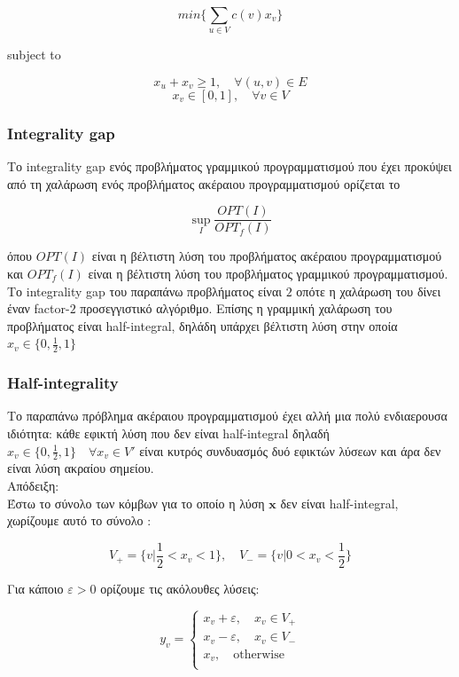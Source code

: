 $$min\{\displaystyle\sum_{u\in{V}} c(v)x_v\}$$ 
\centerline{subject to}
$$x_u + x_v \geq{1}, \quad \forall (u, v) \in{E}$$
$$ x_v \in [0,1], \quad \forall v \in{V}$$

\subsubsection{Integrality gap}
Το integrality gap ενός προβλήματος γραμμικού προγραμματισμού που έχει προκύψει από τη χαλάρωση ενός προβλήματος ακέραιου προγραμματισμού ορίζεται το 

$$\sup_{I} \frac{OPT(I)}{OPT_f(I)}$$

όπου $OPT(I)$ είναι η βέλτιστη λύση του προβλήματος ακέραιου προγραμματισμού και $OPT_f(I)$ είναι η βέλτιστη λύση του προβλήματος γραμμικού προγραμματισμού.\\

Το integrality gap του παραπάνω προβλήματος είναι $2$ οπότε η χαλάρωση του δίνει έναν factor-$2$ προσεγγιστικό αλγόριθμο. Επίσης η γραμμική χαλάρωση του προβλήματος είναι half-integral, δηλάδη υπάρχει βέλτιστη λύση στην οποία $x_v \in{\{0, \frac{1}{2}, 1\}}$	

\subsubsection{Half-integrality}

Το παραπάνω πρόβλημα ακέραιου προγραμματισμού έχει αλλή μια πολύ ενδιαερουσα ιδιότητα: κάθε εφικτή λύση που δεν είναι half-integral δηλαδή $x_v \in{\{0, \frac{1}{2}, 1\}} \quad \forall x_v \in V'$ είναι κυτρός συνδυασμός δυό εφικτών λύσεων και άρα δεν είναι λύση ακραίου σημείου.\\

Απόδειξη:\\
Έστω το σύνολο των κόμβων για το οποίο η λύση $\boldsymbol{x}$ δεν είναι half-integral, χωρίζουμε αυτό το σύνολο :

$$V_{+}=\Big\{v \Big| \frac{1}{2} < x_v < 1\Big\}, \quad V_{-}=\Big\{v \Big| 0 < x_v < \frac{1}{2} \Big\}$$

Για κάποιο $\varepsilon > 0$ ορίζουμε τις ακόλουθες λύσεις: 

$$y_v = \begin{cases}
x_v + \varepsilon, \quad x_v \in V_{+}\\
x_v - \varepsilon, \quad x_v \in V_{-}\\
x_v , \quad \text{otherwise}\\
\end{cases}$$

